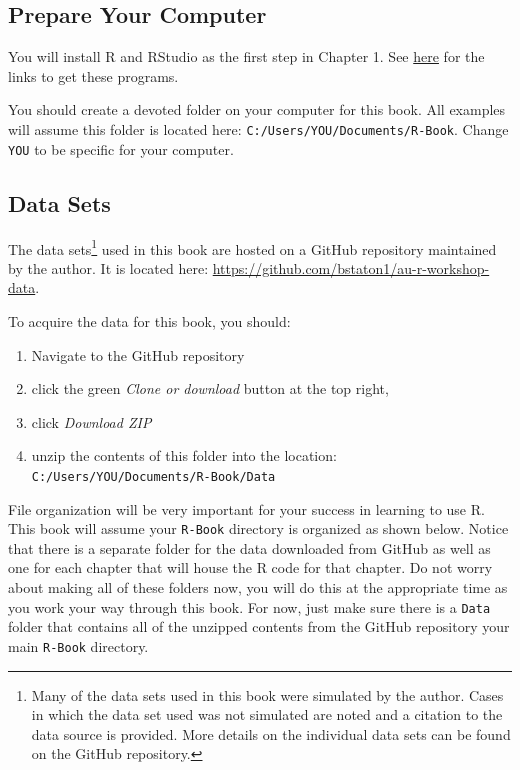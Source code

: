 \documentclass[]{book}
\providecommand{\tightlist}{%
  \setlength{\itemsep}{0pt}\setlength{\parskip}{0pt}}
\let\rmarkdownfootnote\footnote%
\def\footnote{\protect\rmarkdownfootnote}
\theoremstyle{definition}
\theoremstyle{definition}
\theoremstyle{definition}
\theoremstyle{remark}
\begin{document}
\subsection*{Prepare Your Computer}\label{comp-prep}

You will install R and RStudio as the first step in Chapter 1. See
\protect\hyperlink{install}{here} for the links to get these programs.

You should create a devoted folder on your computer for this book. All
examples will assume this folder is located here:
\texttt{C:/Users/YOU/Documents/R-Book}. Change \texttt{YOU} to be
specific for your computer.

\hypertarget{data-sets}{\subsection*{Data Sets}\label{data-sets}}

The data sets\footnote{Many of the data sets used in this book were
  simulated by the author. Cases in which the data set used was not
  simulated are noted and a citation to the data source is provided.
  More details on the individual data sets can be found on the GitHub
  repository.} used in this book are hosted on a GitHub repository
maintained by the author. It is located here:
\url{https://github.com/bstaton1/au-r-workshop-data}.

To acquire the data for this book, you should:

\begin{enumerate}
\def\labelenumi{\arabic{enumi}.}
\tightlist
\item
  Navigate to the GitHub repository
\item
  click the green \emph{Clone or download} button at the top right,
\item
  click \emph{Download ZIP}
\item
  unzip the contents of this folder into the location:
  \texttt{C:/Users/YOU/Documents/R-Book/Data}
\end{enumerate}

File organization will be very important for your success in learning to
use R. This book will assume your \texttt{R-Book} directory is organized
as shown below. Notice that there is a separate folder for the data
downloaded from GitHub as well as one for each chapter that will house
the R code for that chapter. Do not worry about making all of these
folders now, you will do this at the appropriate time as you work your
way through this book. For now, just make sure there is a \texttt{Data}
folder that contains all of the unzipped contents from the GitHub
repository your main \texttt{R-Book} directory.
\end{document}
